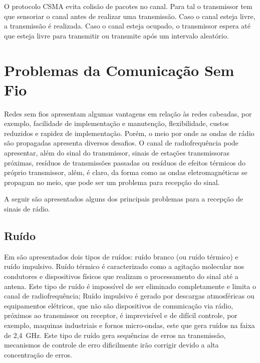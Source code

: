 O protocolo CSMA evita colisão de pacotes no canal. Para tal o transmissor tem que sensoriar o canal antes de realizar uma transmissão. Caso o canal esteja livre, a transmissão é realizada. Caso o canal esteja ocupado, o transmissor espera até que esteja livre para transmitir ou transmite após um intervalo aleatório.


\section{Problemas da Comunicação Sem Fio}
Redes sem fios apresentam algumas vantagens em relação às redes cabeadas, por exemplo, facilidade de implementação e manutenção, flexibilidade, custos reduzidos e rapidez de implementação. Porém, o meio por onde as ondas de rádio são propagadas apresenta diversos desafios. O canal de radiofrequência pode apresentar, além do sinal do transmissor, sinais de estações transmissoras próximas, resíduos de transmissões passadas ou resíduos de efeitos térmicos do próprio transmissor, além, é claro, da forma como as ondas eletromagnéticas se propagam no meio, que pode ser um problema para recepção do sinal.

A seguir são apresentados alguns dos principais problemas para a recepção de sinais de rádio.

\subsection{Ruído}
Em \cite{rochol2018sistemas} são apresentados dois tipos de ruídos: ruído branco (ou ruído térmico) e ruído impulsivo. Ruído térmico é caracterizado como a agitação molecular nos condutores e dispositivos físicos que realizam o processamento do sinal até a antena. Este tipo de ruído é impossível de ser eliminado completamente e limita o canal de radiofrequência; Ruído impulsivo é gerado por descargas atmosféricas ou equipamentos elétricos, que não são dispositivos de comunicação via rádio, próximos ao transmissor ou receptor, é imprevisível e de difícil controle, por exemplo, maquinas industriais e fornos micro-ondas, este que gera ruídos na faixa de 2,4~GHz. Este tipo de ruído gera sequências de erros na transmissão, mecanismos de controle de erro dificilmente irão corrigir devido a alta concentração de erros.

